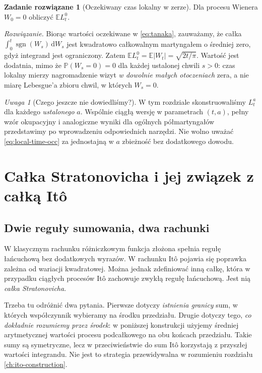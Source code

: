 \documentclass[11pt,a4paper,oneside]{report}
\numberwithin{equation}{chapter}
\theoremstyle{plain}
\theoremstyle{definition}
\newtheorem{zadanie}{Zadanie rozwiązane}[chapter]
\theoremstyle{remark}
\newtheorem{uwaga}{Uwaga}[chapter]
\newcommand{\Prob}{\mathbb{P}}
\newcommand{\E}{\mathbb{E}}
\newcommand{\dd}{\mathrm{d}}
\begin{document}
\begin{zadanie}[Oczekiwany czas lokalny w zerze]
Dla procesu Wienera $W_0=0$ obliczyć $\E L_t^0$.

\emph{Rozwiązanie.} Biorąc wartości oczekiwane w
\eqref{eq:tanaka}, zauważamy, że całka
$\int_0^t\operatorname{sgn}(W_s)\,\dd W_s$ jest
kwadratowo całkowalnym martyngałem o średniej zero,
gdyż integrand jest ograniczony. Zatem
$\E L_t^0=\E|W_t|=\sqrt{2t/\pi}$.
Wartość jest dodatnia, mimo że $\Prob(W_s=0)=0$
dla każdej ustalonej chwili $s>0$: czas lokalny
mierzy nagromadzenie wizyt \emph{w dowolnie małych
otoczeniach} zera, a nie miarę Lebesgue'a zbioru
chwil, w których $W_s=0$.
\end{zadanie}

\begin{uwaga}[Czego jeszcze nie dowiedliśmy?]
W tym rozdziale skonstruowaliśmy $L_t^a$ dla każdego
\emph{ustalonego} $a$. Wspólnie ciągłą wersję w
parametrach $(t,a)$, pełny wzór okupacyjny i
analogiczne wyniki dla ogólnych półmartyngałów
przedstawimy po wprowadzeniu odpowiednich narzędzi.
Nie wolno uważać \eqref{eq:local-time-occ} za
jednostajną w $a$ zbieżność bez dodatkowego dowodu.
\end{uwaga}


\chapter{Całka Stratonovicha i jej związek z całką Itô}
\label{ch:stratonovich}

\section{Dwie reguły sumowania, dwa rachunki}
W klasycznym rachunku różniczkowym funkcja złożona
spełnia regułę łańcuchową bez dodatkowych wyrazów.
W rachunku Itô pojawia się poprawka zależna od wariacji
kwadratowej. Można jednak zdefiniować inną całkę,
która w przypadku ciągłych procesów Itô zachowuje
zwykłą regułę łańcuchową. Jest nią \emph{całka
Stratonovicha}.

Trzeba tu odróżnić dwa pytania. Pierwsze dotyczy
\emph{istnienia granicy} sum, w których współczynnik
wybieramy na środku przedziału. Drugie dotyczy tego,
\emph{co dokładnie rozumiemy przez środek}: w poniższej
konstrukcji użyjemy średniej arytmetycznej wartości
procesu podcałkowego na obu końcach przedziału.
Takie sumy są symetryczne, lecz w przeciwieństwie do
sum Itô korzystają z przyszłej wartości integrandu.
Nie jest to strategia przewidywalna w rozumieniu
rozdziału \ref{ch:ito-construction}.
\end{document}
